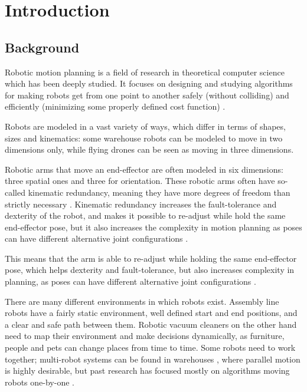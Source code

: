 \section{Introduction}

\subsection{Background}

Robotic motion planning is a field of research in theoretical computer science which has been deeply studied. 
It focuses on designing and studying algorithms for making robots get from one point to another safely (without colliding) and efficiently (minimizing some properly defined cost function) \cite{chosetPrinciplesRobotMotion2005}.

Robots are modeled in a vast variety of ways, which differ in terms of shapes, sizes and kinematics: 
some warehouse robots can be modeled to move in two dimensions only, while flying drones can be seen as moving in three dimensions.

Robotic arms that move an end-effector are often modeled in six dimensions: three spatial ones and three for orientation. 
These robotic arms often have so-called kinematic redundancy, meaning they have more degrees of freedom than strictly necessary \cite{sicilianoSpringerHandbookRobotics2016}.
Kinematic redundancy increases the fault-tolerance and dexterity of the robot, and makes it possible to re-adjust while hold the same end-effector pose, but it also increases the complexity in motion planning as poses can have different alternative joint configurations \cite{sicilianoSpringerHandbookRobotics2016}. 

This means that the arm is able to re-adjust while holding the same end-effector pose, which helps dexterity and fault-tolerance, but also increases complexity in planning, as poses can have different alternative joint configurations \cite{sicilianoSpringerHandbookRobotics2016}.

There are many different environments in which robots exist. 
Assembly line robots have a fairly static environment, well defined start and end positions, and a clear and safe path between them.
Robotic vacuum cleaners on the other hand need to map their environment and make decisions dynamically, as furniture, people and pets can change places from time to time. 
Some robots need to work together; multi-robot systems can be found in warehouses \cite{sicilianoSpringerHandbookRobotics2016}, where parallel motion is highly desirable, but past research has focused mostly on algorithms moving robots one-by-one \cite{demaineCoordinatedMotionPlanning2019}.

